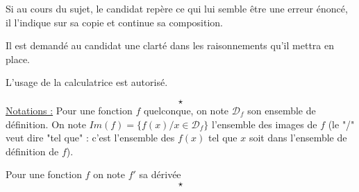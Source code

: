 

\usepackage{empheq}
\usepackage[c]{esvect}
\newcommand{\covec}[2]{\begin{pmatrix}#1 \\#2 \end{pmatrix}}




\flushleft
Si au cours du sujet, le candidat repère ce qui lui semble être une erreur énoncé, il l'indique sur sa copie et continue sa composition. \newline

Il est demandé au candidat une clarté dans les raisonnements qu'il mettra en place. \newline

L'usage de la calculatrice est autorisé.\newline

$$\star$$
\underline{Notations :}\newline
Pour une fonction $f$ quelconque, on note $\mathscr{D}_f$ son ensemble de définition. On note $Im(f) = \{f(x)/x\in \mathscr{D}_f\}$ l'ensemble des images de $f$ (le "/" veut dire "tel que" : c'est l'ensemble des $f(x)$ tel que $x$ soit dans l'ensemble de définition de $f$).\newline

Pour une fonction $f$ on note $f'$ sa dérivée
$$\star$$
